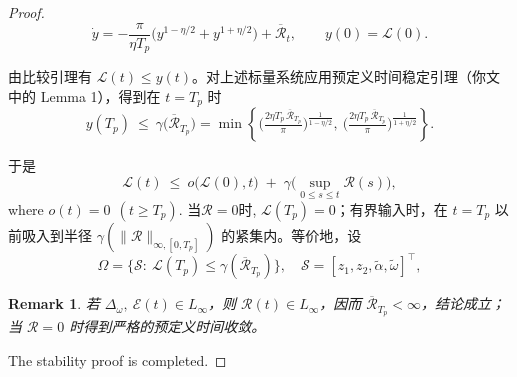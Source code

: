 \documentclass[pdflatex,sn-mathphys-num]{sn-jnl}%
\theoremstyle{thmstyleone}%
\theoremstyle{thmstyletwo}%
\newtheorem{remark}{Remark}%
\theoremstyle{thmstylethree}%
\begin{document}
\begin{proof}
$$
\dot y= -\frac{\pi}{\eta T_p}\Big(y^{1-{\eta}/{2}}+y^{1+{\eta}/{2}}\Big)+\overline{\mathcal{R}}_t,\qquad y(0)=\mathcal{L}(0).
$$

由比较引理有 $\mathcal{L}(t)\le y(t)$。对上述标量系统应用预定义时间稳定引理（你文中的 Lemma 1），得到在 $t=T_p$ 时
$$
y(T_p)\ \le\ 
\gamma\!\big(\overline{\mathcal{R}}_{T_p}\big)
=\min\!\left\{
\Big(\tfrac{2\eta T_p\,\overline{\mathcal{R}}_{T_p}}{\pi}\Big)^{\!\frac{1}{1-{\eta}/{2}}},
\ \Big(\tfrac{2\eta T_p\,\overline{\mathcal{R}}_{T_p}}{\pi}\Big)^{\!\frac{1}{1+{\eta}/{2}}}
\right\}.
$$

于是
$$
\mathcal{L}(t)\ \le\ o \big(\mathcal{L}(0),t\big)\;+\;\gamma\!\Big(\sup_{0\le s\le t}\mathcal{R}(s)\Big),
$$
where $o(t)=0\ \ (t\ge T_p)$. 当$\mathcal{R}=0$时, $\mathcal{L}(T_p)=0$；有界输入时，在 $t=T_p$ 以前吸入到半径 $\gamma(\|\mathcal{R}\|_{\infty,[0,T_p]})$ 的紧集内。等价地，设
$$
\Omega=\big\{\mathcal{S}:\ \mathcal{L}(T_p)\le \gamma(\overline{\mathcal{R}}_{T_p})\big\},\quad 
\mathcal{S}=[z_1,z_2,\tilde\alpha,\tilde\omega]^\top,
$$
\begin{remark}
	若 $\Delta_\omega,\ \mathcal{E}(t)\in L_\infty$，则 $\mathcal{R}(t)\in L_\infty$，因而 $\overline{\mathcal{R}}_{T_p}<\infty$，结论成立；当 $\mathcal{R}=0$ 时得到严格的预定义时间收敛。
\end{remark}




The stability proof is completed.

\end{proof}
\end{document}

